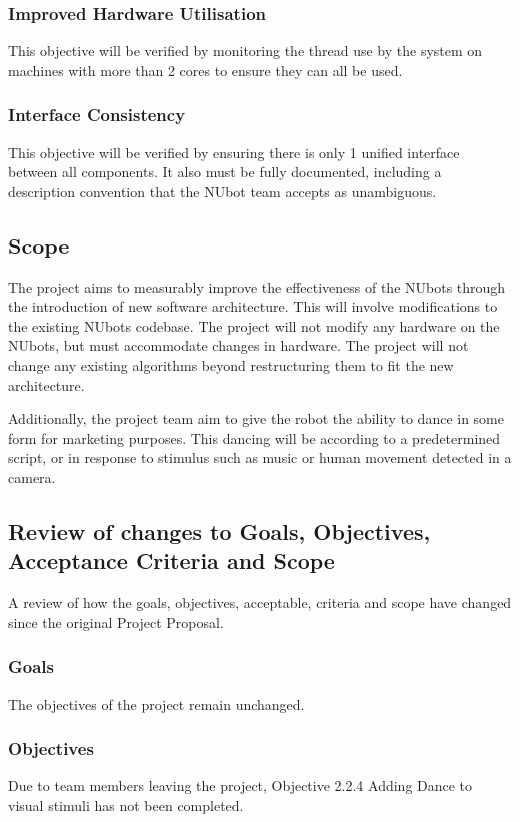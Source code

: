 \documentclass[english,12pt]{scrartcl}
\begin{document}
			\subsubsection{Improved Hardware Utilisation}
				This objective will be verified by monitoring the thread use by the system on machines with more than 2 cores to ensure they can all be used. 
			
			\subsubsection{Interface Consistency}
				This objective will be verified by ensuring there is only 1 unified interface between all components.
				It also must be fully documented, including a description convention that the NUbot team accepts as unambiguous.

		\subsection {Scope}
			The project aims to measurably improve the effectiveness of the NUbots through the introduction of new software architecture.
			This will involve modifications to the existing NUbots codebase.
			The project will not modify any hardware on the NUbots, but must accommodate changes in hardware.
			The project will not change any existing algorithms beyond restructuring them to fit the new architecture.
			
			Additionally, the project team aim to give the robot the ability to dance in some form for marketing purposes.
			This dancing will be according to a predetermined script, or in response to stimulus such as music or human movement detected in a camera.
				
		\subsection {Review of changes to Goals, Objectives, Acceptance Criteria and Scope}
			A review of how the goals, objectives, acceptable, criteria and scope have changed since the original Project Proposal. 
			
			\subsubsection{Goals}
				The objectives of the project remain unchanged.
			
			\subsubsection{Objectives}
				Due to team members leaving the project, Objective 2.2.4 Adding Dance to visual stimuli has not been completed.
			
\end{document}
